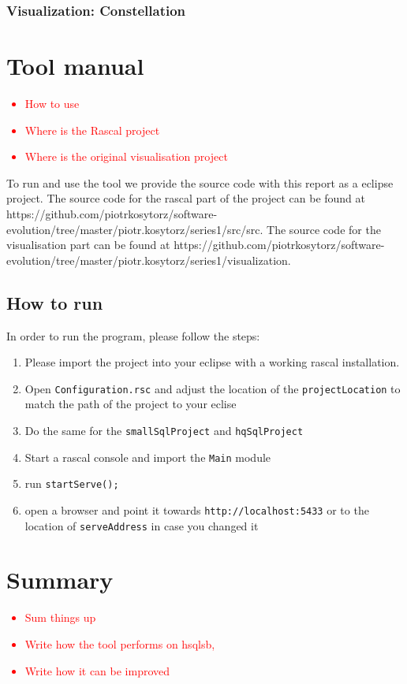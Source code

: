 \documentclass{uva-inf-article}
\newcommand\todo[1]{\textcolor{red}{#1}}
\begin{document}
\subsubsection{Visualization: Constellation}

\section{Tool manual}
\todo {
	\begin{itemize}
		\item{How to use}
		\item{Where is the Rascal project}
		\item{Where is the original visualisation project }
	\end{itemize}
}

To run and use the tool we provide the source code with this report as a eclipse project. The source code for the rascal part of the project can be found at https://github.com/piotrkosytorz/software-evolution/tree/master/piotr.kosytorz/series1/src/src. The source code for the visualisation part can be found at https://github.com/piotrkosytorz/software-evolution/tree/master/piotr.kosytorz/series1/visualization.

\subsection{How to run}

In order to run the program, please follow the steps:

\begin{enumerate}
\item
  Please import the project into your eclipse with a working rascal
  installation.
\item
  Open \texttt{Configuration.rsc} and adjust the location of the
  \texttt{projectLocation} to match the path of the project to your
  eclise
\item
  Do the same for the \texttt{smallSqlProject} and \texttt{hqSqlProject}
\item
  Start a rascal console and import the \texttt{Main} module
\item
  run \texttt{startServe();}
\item
  open a browser and point it towards \texttt{http://localhost:5433} or
  to the location of \texttt{serveAddress} in case you changed it
\end{enumerate}


\section{Summary}
\todo {
	\begin{itemize}
		\item{Sum things up}
		\item{Write how the tool performs on hsqlsb,}
		\item{Write how it can be improved}
	\end{itemize}
}
\end{document}
